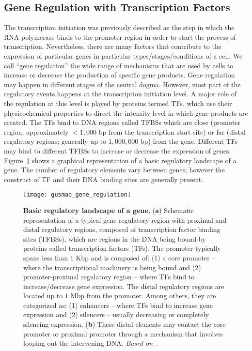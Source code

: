 \subsection{Gene Regulation with Transcription Factors}
\label{sec:gene.regulation.transcription.factors}

The transcription initiation was previously described as the step in which the RNA polymerase binds to the promoter region in order to start the process of transcription. Nevertheless, there are many factors that contribute to the expression of particular genes in particular types/stages/conditions of a cell. We call ``gene regulation'' the wide range of mechanisms that are used by cells to increase or decrease the production of specific gene products. Gene regulation may happen in different stages of the central dogma. However, most part of the regulatory events happens at the transcription initiation level. A major role of the regulation at this level is played by proteins termed TFs, which use their physicochemical properties to direct the intensity level in which gene products are created. The TFs bind to DNA regions called TFBSs which are close (promoter region; approximately $< 1,000$ bp from the transcription start site) or far (distal regulatory regions; generally up to $1,000,000$ bp) from the gene. Different TFs may bind to different TFBSs to increase or decrease the expression of genes. Figure~\ref{fig:gusmao_gene_regulation} shows a graphical representation of a basic regulatory landscape of a gene. The number of regulatory elements vary between genes; however the construct of TF and their DNA binding sites are generally present.

\begin{figure}[h!]
\centering
\texttt{[image: gusmao\_gene\_regulation]}
\caption[Basic regulatory landscape of a gene]{\textbf{Basic regulatory landscape of a gene.} (\textbf{a}) Schematic representation of a typical gene regulatory region with proximal and distal regulatory regions, composed of transcription factor binding sites (TFBSs), which are regions in the DNA being bound by proteins called transcription factors (TFs). The promoter typically spans less than $1$ Kbp and is composed of: (1) a core promoter -- where the transcriptional machinery is being bound and (2) promoter-proximal regulatory region -- where TFs bind to increase/decrease gene expression. The distal regulatory regions are located up to $1$ Mbp from the promoter. Among others, they are categorized as: (1) enhancers -- where TFs bind to increase gene expression and (2) silencers -- usually decreasing or completely silencing expression. (\textbf{b}) These distal elements may contact the core promoter or proximal promoter through a mechanism that involves looping out the intervening DNA. \emph{Based on~\cite{lodish2007}}.}
\label{fig:gusmao_gene_regulation}
\end{figure}

